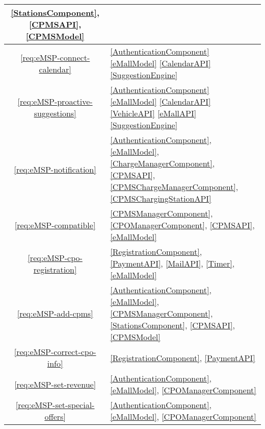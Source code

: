 \begin{table}[h]
\begin{center}
\begin{tabular}{|c||p{15.5cm}|}
            \ref{StationsComponent},
            \ref{CPMSAPI},
            \ref{CPMSModel}
            \\
            \hline
            \ref{req:eMSP-connect-calendar}      &
            \ref{AuthenticationComponent}
            \ref{eMallModel}
            \ref{CalendarAPI}
            \ref{SuggestionEngine}
            \\
            \hline
            \ref{req:eMSP-proactive-suggestions} &
            \ref{AuthenticationComponent}
            \ref{eMallModel}
            \ref{CalendarAPI}
            \ref{VehicleAPI}
            \ref{eMallAPI}
            \ref{SuggestionEngine}
            \\
            \hline
            \ref{req:eMSP-notification}          &
            \ref{AuthenticationComponent},
            \ref{eMallModel},
            \ref{ChargeManagerComponent},
            \ref{CPMSAPI},
            \ref{CPMSChargeManagerComponent},
            \ref{CPMSChargingStationAPI}
            \\
            \hline
            \ref{req:eMSP-compatible}            &
            \ref{CPMSManagerComponent},
            \ref{CPOManagerComponent},
            \ref{CPMSAPI},
            \ref{eMallModel}
            \\
            \hline
            \ref{req:eMSP-cpo-registration}      &
            \ref{RegistrationComponent},
            \ref{PaymentAPI},
            \ref{MailAPI},
            \ref{Timer},
            \ref{eMallModel}
            \\
            \hline
            \ref{req:eMSP-add-cpms}              &
            \ref{AuthenticationComponent},
            \ref{eMallModel},
            \ref{CPMSManagerComponent},
            \ref{StationsComponent},
            \ref{CPMSAPI},
            \ref{CPMSModel}
            \\
            \hline
            \ref{req:eMSP-correct-cpo-info}      &
            \ref{RegistrationComponent},
            \ref{PaymentAPI}
            \\
            \hline
            \ref{req:eMSP-set-revenue}           &
            \ref{AuthenticationComponent},
            \ref{eMallModel},
            \ref{CPOManagerComponent}
            \\
            \hline
            \ref{req:eMSP-set-special-offers}    &
            \ref{AuthenticationComponent},
            \ref{eMallModel},
            \ref{CPOManagerComponent}
            \\

\end{tabular}
\end{center}
\end{table}
